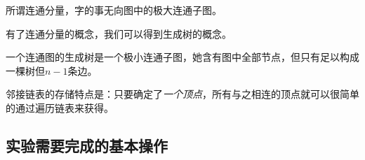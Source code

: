 \begin{definition}
    所谓连通分量，字的事无向图中的极大连通子图。
\end{definition}

有了连通分量的概念，我们可以得到生成树的概念。

\begin{definition}
    一个连通图的生成树是一个极小连通子图，她含有图中全部节点，但只有足以构成一棵树但$n-1$条边。
\end{definition}

邻接链表的存储特点是：只要确定了\emph{一个顶点}，所有与之相连的顶点就可以很简单的通过遍历链表来获得。

\subsection{实验需要完成的基本操作}
